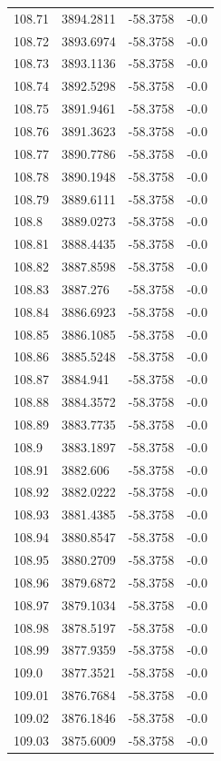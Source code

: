\begin{table}[H]
\begin{tabular}{llll}
108.71 & 3894.2811 & -58.3758 & -0.0 \\
108.72 & 3893.6974 & -58.3758 & -0.0 \\
108.73 & 3893.1136 & -58.3758 & -0.0 \\
108.74 & 3892.5298 & -58.3758 & -0.0 \\
108.75 & 3891.9461 & -58.3758 & -0.0 \\
108.76 & 3891.3623 & -58.3758 & -0.0 \\
108.77 & 3890.7786 & -58.3758 & -0.0 \\
108.78 & 3890.1948 & -58.3758 & -0.0 \\
108.79 & 3889.6111 & -58.3758 & -0.0 \\
108.8 & 3889.0273 & -58.3758 & -0.0 \\
108.81 & 3888.4435 & -58.3758 & -0.0 \\
108.82 & 3887.8598 & -58.3758 & -0.0 \\
108.83 & 3887.276 & -58.3758 & -0.0 \\
108.84 & 3886.6923 & -58.3758 & -0.0 \\
108.85 & 3886.1085 & -58.3758 & -0.0 \\
108.86 & 3885.5248 & -58.3758 & -0.0 \\
108.87 & 3884.941 & -58.3758 & -0.0 \\
108.88 & 3884.3572 & -58.3758 & -0.0 \\
108.89 & 3883.7735 & -58.3758 & -0.0 \\
108.9 & 3883.1897 & -58.3758 & -0.0 \\
108.91 & 3882.606 & -58.3758 & -0.0 \\
108.92 & 3882.0222 & -58.3758 & -0.0 \\
108.93 & 3881.4385 & -58.3758 & -0.0 \\
108.94 & 3880.8547 & -58.3758 & -0.0 \\
108.95 & 3880.2709 & -58.3758 & -0.0 \\
108.96 & 3879.6872 & -58.3758 & -0.0 \\
108.97 & 3879.1034 & -58.3758 & -0.0 \\
108.98 & 3878.5197 & -58.3758 & -0.0 \\
108.99 & 3877.9359 & -58.3758 & -0.0 \\
109.0 & 3877.3521 & -58.3758 & -0.0 \\
109.01 & 3876.7684 & -58.3758 & -0.0 \\
109.02 & 3876.1846 & -58.3758 & -0.0 \\
109.03 & 3875.6009 & -58.3758 & -0.0 \\

\end{tabular}
\end{table}
